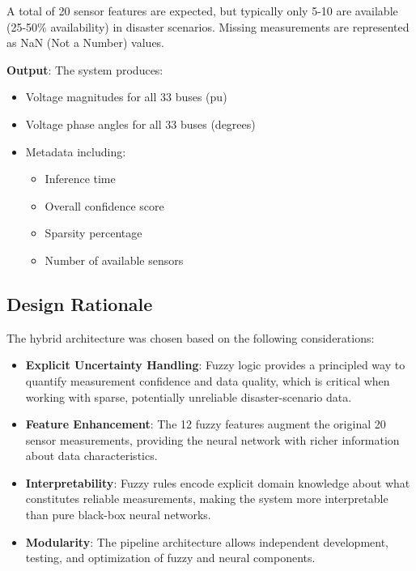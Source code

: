 \documentclass[12pt,a4paper]{report}
\begin{document}
A total of 20 sensor features are expected, but typically only 5-10 are available (25-50\% availability) in disaster scenarios. Missing measurements are represented as NaN (Not a Number) values.

\textbf{Output}: The system produces:
\begin{itemize}
    \item Voltage magnitudes for all 33 buses (pu)
    \item Voltage phase angles for all 33 buses (degrees)
    \item Metadata including:
    \begin{itemize}
        \item Inference time
        \item Overall confidence score
        \item Sparsity percentage
        \item Number of available sensors
    \end{itemize}
\end{itemize}

\subsection{Design Rationale}

The hybrid architecture was chosen based on the following considerations:

\begin{itemize}
    \item \textbf{Explicit Uncertainty Handling}: Fuzzy logic provides a principled way to quantify measurement confidence and data quality, which is critical when working with sparse, potentially unreliable disaster-scenario data.
    
    \item \textbf{Feature Enhancement}: The 12 fuzzy features augment the original 20 sensor measurements, providing the neural network with richer information about data characteristics.
    
    \item \textbf{Interpretability}: Fuzzy rules encode explicit domain knowledge about what constitutes reliable measurements, making the system more interpretable than pure black-box neural networks.
    
    \item \textbf{Modularity}: The pipeline architecture allows independent development, testing, and optimization of fuzzy and neural components.
\end{itemize}
\end{document}
